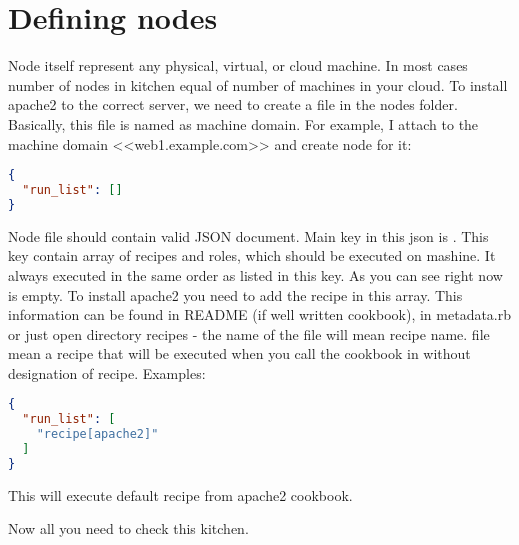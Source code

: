 \section{Defining nodes}\label{sec:solo-node}

Node itself represent any physical, virtual, or cloud machine. In most cases number of nodes in kitchen equal of number of machines in your cloud. To install apache2 to the correct server, we need to create a file in the nodes folder. Basically, this file is named as machine domain. For example, I attach to the machine domain <<web1.example.com>> and create node for it:

\begin{lstlisting}[language=JSON,label=lst:my-cloud-node1,title=my-cloud/nodes/web1.example.com.json]
{
  "run_list": []
}
\end{lstlisting}

Node file should contain valid JSON document. Main key in this json is . This key contain array of recipes and roles, which should be executed on mashine. It always executed in the same order as listed in this key. As you can see right now  is empty. To install apache2 you need to add the recipe in this array. This information can be found in README (if well written cookbook), in metadata.rb or just open directory recipes - the name of the file will mean recipe name.  file mean a recipe that will be executed when you call the cookbook in  without designation of recipe. Examples:

\begin{lstlisting}[language=JSON,label=lst:my-cloud-node2,title=my-cloud/nodes/web1.example.com.json]
{
  "run_list": [
    "recipe[apache2]"
  ]
}
\end{lstlisting}

This  will execute default recipe from apache2 cookbook.

Now all you need to check this kitchen.
